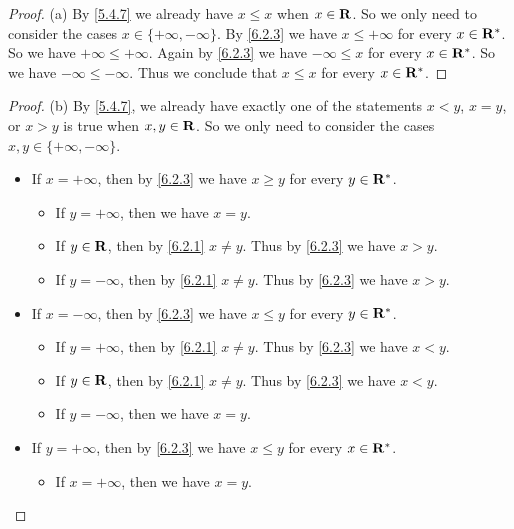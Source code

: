 \begin{proof}{(a)}
  By \cref{5.4.7} we already have \(x \leq x\) when \(x \in \mathbf{R}\).
  So we only need to consider the cases \(x \in \{+\infty, -\infty\}\).
  By \cref{6.2.3} we have \(x \leq +\infty\) for every \(x \in \mathbf{R}^*\).
  So we have \(+\infty \leq +\infty\).
  Again by \cref{6.2.3} we have \(-\infty \leq x\) for every \(x \in \mathbf{R}^*\).
  So we have \(-\infty \leq -\infty\).
  Thus we conclude that \(x \leq x\) for every \(x \in \mathbf{R}^*\).
\end{proof}

\begin{proof}{(b)}
  By \cref{5.4.7}, we already have exactly one of the statements \(x < y\), \(x = y\), or \(x > y\) is true when \(x, y \in \mathbf{R}\).
  So we only need to consider the cases \(x, y \in \{+\infty, -\infty\}\).
  \begin{itemize}
    \item If \(x = +\infty\), then by \cref{6.2.3} we have \(x \geq y\) for every \(y \in \mathbf{R}^*\).
          \begin{itemize}
            \item If \(y = +\infty\), then we have \(x = y\).
            \item If \(y \in \mathbf{R}\), then by \cref{6.2.1} \(x \neq y\).
                  Thus by \cref{6.2.3} we have \(x > y\).
            \item If \(y = -\infty\), then by \cref{6.2.1} \(x \neq y\).
                  Thus by \cref{6.2.3} we have \(x > y\).
          \end{itemize}
    \item If \(x = -\infty\), then by \cref{6.2.3} we have \(x \leq y\) for every \(y \in \mathbf{R}^*\).
          \begin{itemize}
            \item If \(y = +\infty\), then by \cref{6.2.1} \(x \neq y\).
                  Thus by \cref{6.2.3} we have \(x < y\).
            \item If \(y \in \mathbf{R}\), then by \cref{6.2.1} \(x \neq y\).
                  Thus by \cref{6.2.3} we have \(x < y\).
            \item If \(y = -\infty\), then we have \(x = y\).
          \end{itemize}
    \item If \(y = +\infty\), then by \cref{6.2.3} we have \(x \leq y\) for every \(x \in \mathbf{R}^*\).
          \begin{itemize}
            \item If \(x = +\infty\), then we have \(x = y\).

\end{itemize}
\end{itemize}
\end{proof}
